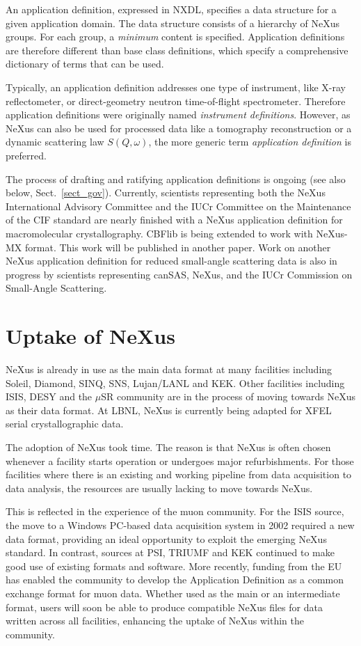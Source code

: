 \documentclass[%
 aip,
rsi,
 amsmath,amssymb,
 reprint,%
]{revtex4-1}
\begin{document}
An application definition, expressed in NXDL, specifies a data structure
for a given application domain.
The data structure consists of a hierarchy of NeXus groups.
For each group, a \emph{minimum} content is specified.
Application definitions are therefore different than
base class definitions, which specify a comprehensive 
dictionary of terms that can be used.

Typically, an application definition addresses one type of instrument,
like X-ray reflectometer,
or direct-geometry neutron time-of-flight spectrometer.
Therefore application definitions were originally named \emph{instrument definitions}.
However, as NeXus can also be used for processed data
like a tomography reconstruction or a dynamic scattering law $S(Q,\omega)$, 
the more generic term \emph{application definition} is preferred.

The process of drafting and ratifying application definitions
is ongoing (see also below, Sect.~\ref{sect_gov}).
Currently, scientists representing both
the NeXus International Advisory Committee and the IUCr Committee on the Maintenance
of the CIF standard 
are nearly finished with a NeXus application definition for macromolecular crystallography.
CBFlib\cite{cbflib} is being extended to work with NeXus-MX format. This work will be published in another paper. 
Work on another NeXus application definition for reduced small-angle scattering data
is also in progress\cite{cansas}  by scientists representing
canSAS, NeXus, and the IUCr Commission on Small-Angle Scattering.


\section{Uptake of NeXus} 

NeXus is already in use as the main data format at many facilities including Soleil, Diamond, SINQ, SNS, Lujan/LANL 
and KEK. Other facilities including ISIS, DESY and the $\mu$SR community are in the process of moving towards 
NeXus as their data format. At LBNL, NeXus is currently being adapted for XFEL serial crystallographic data. 


The adoption of NeXus took time. The reason is that NeXus is often chosen whenever 
a facility starts operation or undergoes major refurbishments. For those facilities where there is an existing and working 
pipeline from data acquisition to data analysis,  the resources are usually lacking to move 
towards NeXus.

This is reflected in the experience of the muon community. For the ISIS source, the move to a Windows PC-based data acquisition 
system in 2002 required a new data format, providing an ideal opportunity to exploit the emerging NeXus standard\cite{muon1}. In 
contrast, sources at PSI, TRIUMF and KEK continued to make good use of existing formats and software. More recently, funding 
from the EU has enabled the community to develop the Application Definition as a common exchange format for muon data\cite{muon2}. 
Whether used as the main or an intermediate format, users will soon be able to produce compatible NeXus files for data written 
across all facilities, enhancing the uptake of NeXus within the community.
\end{document}
